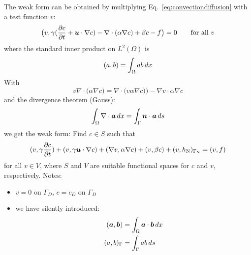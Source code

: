 The weak form can be obtained by multiplying Eq.~\eqref{eq:convectiondiffusion}
with a test function $v$:
\[
   \big(v,\gamma(\dfrac{\partial c}{\partial t} + \boldsymbol{u}\cdot\nabla c)
     -\nabla\cdot( \alpha \nabla c)+ \beta c-f\big)=0\qquad\text{for all }v
\]
where the standard inner product on $L^2(\Omega)$ is
\[
    (a,b)=\int_\Omega ab \,d x
\]
With
\[
   v\nabla\cdot\big(\alpha\nabla c\big)=\nabla\cdot\big(v\alpha\nabla c)\big)
-\nabla v\cdot\alpha\nabla c
\]
and the divergence theorem (Gauss):
\[
    \int_\Omega\nabla\cdot\boldsymbol{a}\,d x=\int_\Gamma\boldsymbol{n}\cdot\boldsymbol{a}\,d s
\]
we get the weak form: Find $c\in S$ such that
\begin{equation}
   (v,\gamma\dfrac{\partial c}{\partial t})+(v,\gamma \boldsymbol{u}\cdot\nabla c)
   +(\nabla v,\alpha\nabla c) + (v,\beta c) +
             (v,h_{\text{N}})_{\Gamma_{\text{N}}}=(v,f)
   \label{eq:weakformdiffusion}
\end{equation}
for all $v\in V$, where $S$ and $V$ are suitable functional spaces for $c$ and
$v$, respectively. Notes:
\begin{itemize}
  \itemsep -1ex
   \item $v=0$ on $\Gamma_D$, $c=c_D$ on $\Gamma_D$
   \item we have silently introduced:
\begin{align*}
   (\boldsymbol{a}, \boldsymbol{b})&=\int_\Omega\boldsymbol{a}\cdot\boldsymbol{b}\,d x\\
   (a,b)_{\Gamma}&=\int_\Gamma a b\,d s
\end{align*}
\end{itemize}

